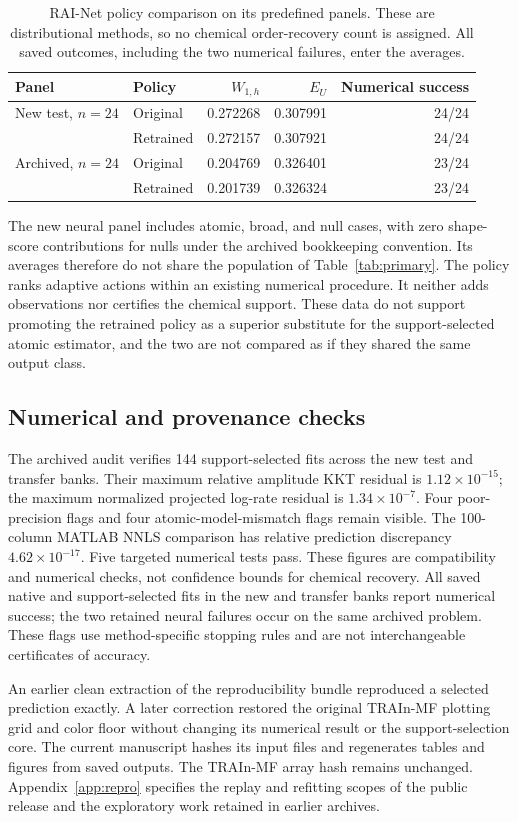 \begin{table}[htbp]\centering
\caption{RAI-Net policy comparison on its predefined panels. These are distributional methods, so no chemical order-recovery count is assigned. All saved outcomes, including the two numerical failures, enter the averages.}\label{tab:net}
\begin{tabular}{llrrr}\toprule
Panel & Policy & $W_{1,h}$ & $E_U$ & Numerical success\\\midrule
New test, $n=24$ & Original & 0.272268 & 0.307991 & 24/24\\
 & Retrained & 0.272157 & 0.307921 & 24/24\\
Archived, $n=24$ & Original & 0.204769 & 0.326401 & 23/24\\
 & Retrained & 0.201739 & 0.326324 & 23/24\\\bottomrule
\end{tabular}
\end{table}

The new neural panel includes atomic, broad, and null cases, with zero shape-score contributions for nulls under the archived bookkeeping convention. Its averages therefore do not share the population of Table~\ref{tab:primary}. The policy ranks adaptive actions within an existing numerical procedure. It neither adds observations nor certifies the chemical support. These data do not support promoting the retrained policy as a superior substitute for the support-selected atomic estimator, and the two are not compared as if they shared the same output class.

\subsection{Numerical and provenance checks}
The archived audit verifies 144 support-selected fits across the new test and transfer banks. Their maximum relative amplitude KKT residual is $1.12\times10^{-15}$; the maximum normalized projected log-rate residual is $1.34\times10^{-7}$. Four poor-precision flags and four atomic-model-mismatch flags remain visible. The 100-column MATLAB NNLS comparison has relative prediction discrepancy $4.62\times10^{-17}$. Five targeted numerical tests pass. These figures are compatibility and numerical checks, not confidence bounds for chemical recovery. All saved native and support-selected fits in the new and transfer banks report numerical success; the two retained neural failures occur on the same archived problem. These flags use method-specific stopping rules and are not interchangeable certificates of accuracy.

An earlier clean extraction of the reproducibility bundle reproduced a selected prediction exactly. A later correction restored the original TRAIn-MF plotting grid and color floor without changing its numerical result or the support-selection core. The current manuscript hashes its input files and regenerates tables and figures from saved outputs. The TRAIn-MF array hash remains unchanged. Appendix~\ref{app:repro} specifies the replay and refitting scopes of the public release and the exploratory work retained in earlier archives.
